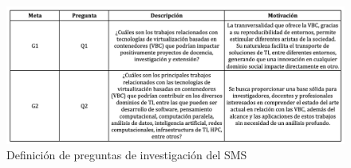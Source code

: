 \begin{figure}[H]
    \centering
    \includegraphics[width=\textwidth] {tablas-images/cp2/preguntasInvestigacion.png}
    \caption{Definición de preguntas de investigación del SMS}\label{fig:tabla-preguntas}
\end{figure}